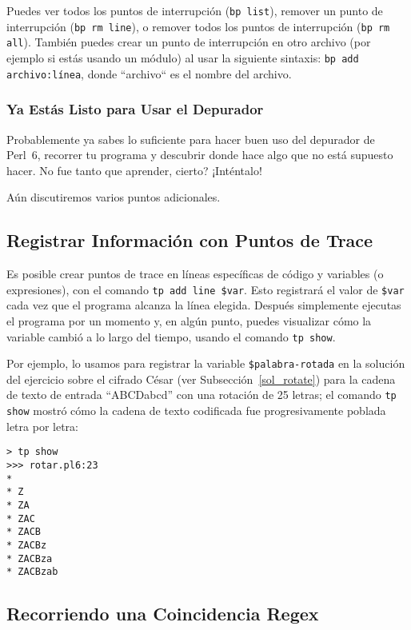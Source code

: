 Puedes ver todos los puntos de interrupción ({\tt bp list}),
remover un punto de interrupción ({\tt bp rm line}), o
remover todos los puntos de interrupción ({\tt bp rm all}).
También puedes crear un punto de interrupción en otro 
archivo (por ejemplo si estás usando un módulo) 
al usar la siguiente sintaxis: {\tt bp add archivo:línea},
donde ``archivo`` es el nombre del archivo.

\subsubsection{Ya Estás Listo para Usar el Depurador}

Probablemente ya sabes lo suficiente para hacer buen uso del 
depurador de Perl~6, recorrer tu programa y descubrir 
donde hace algo que no está supuesto hacer. No fue tanto
que aprender, cierto? ¡Inténtalo!

Aún discutiremos varios puntos adicionales.

\subsection{Registrar Información con Puntos de Trace}

Es posible crear puntos de trace en líneas específicas de código y
variables (o expresiones), con el comando {\tt tp add line \$var}.
Esto registrará el valor de \verb|$var| cada vez que el programa
alcanza la línea elegida. Después simplemente ejecutas el 
programa por un momento y, en algún punto, puedes visualizar
cómo la variable cambió a lo largo del tiempo, usando el comando {\tt tp show}.

Por ejemplo, lo usamos para registrar la variable \verb|$palabra-rotada|
en la solución del ejercicio sobre el cifrado César (ver Subsección~\ref{sol_rotate}) 
para la cadena de texto de entrada ``ABCDabcd'' con una rotación
de 25 letras; el comando {\tt tp show} mostró cómo la cadena de texto
codificada fue progresivamente poblada letra por letra:

\begin{verbatim}
> tp show
>>> rotar.pl6:23
*
* Z
* ZA
* ZAC
* ZACB
* ZACBz
* ZACBza
* ZACBzab
\end{verbatim}

\subsection{Recorriendo una Coincidencia Regex}
\label{regex-debugging}

